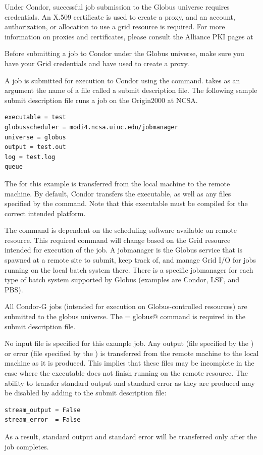 Under Condor, successful job submission to the Globus universe requires
credentials.
An X.509 certificate is used to create a proxy,
and an account, authorization, or allocation to use a grid resource
is required.
For more information on proxies and certificates,
please consult the Alliance PKI pages at 


Before submitting a job to Condor under the Globus universe,
make sure you have your Grid 
credentials and have used  to create a proxy.

A job is submitted for execution to Condor using the
 command.
 takes as an argument
the name of a file called a submit description file.
The following sample submit description file runs a job on
the Origin2000 at NCSA.

\begin{verbatim}
executable = test
globusscheduler = modi4.ncsa.uiuc.edu/jobmanager
universe = globus
output = test.out
log = test.log
queue
\end{verbatim} 

The 
for this example is
transferred from the local machine to the remote machine.
By default, Condor transfers the executable, as well as any
files specified by the  command.
Note that this executable must be compiled for the correct
intended platform.

The  command is dependent on the
scheduling software available on remote resource.
This required command will change based on the Grid resource
intended for execution of the job.
A jobmanager is the Globus service that is spawned at a remote site to
submit, keep track of, and manage Grid I/O for jobs running on the local
batch system there.
There is a specific jobmanager for each type of
batch system supported by Globus (examples are Condor, LSF, and PBS).

All Condor-G jobs (intended for execution on Globus-controlled
resources) are submitted to the globus universe.
The \verb@universe = globus@ command is required
in the submit description file.

No input file is specified for this example job.
Any output (file specified by the )
or error (file specified by the )
is transferred 
from the remote machine to the local machine as it is produced.
This implies that these files may be incomplete in the case
where the executable does not finish running on the remote resource.
The ability to transfer standard output and standard error as
they are produced may be disabled by adding to the submit
description file:
\begin{verbatim}
stream_output = False
stream_error  = False
\end{verbatim}
As a result, standard output and standard error will be transferred
only after the job completes.

